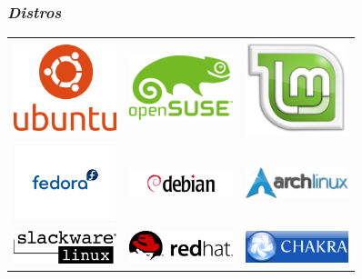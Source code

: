 \documentclass{beamer}
\begin{document}
\begin{frame}
   \frametitle{\emph{Distros}}
   \begin{center}
     \renewcommand\arraystretch{2}
     \begin{tabular}{c c c}
       \includegraphics[width=3cm]{ubuntu.png} & \includegraphics[width=3cm]{opensuse.png} & \includegraphics[width=3cm]{mint.jpg}\\
       \includegraphics[width=3cm,trim=10mm 60mm 10mm 60mm,clip]{fedora.jpg} & \includegraphics[width=3cm]{debian.png} & \includegraphics[width=3cm]{arch.png}\\
       \includegraphics[width=3cm]{slack.png} & \includegraphics[width=3cm]{redhat.jpg} & \includegraphics[width=3cm]{chakra.png}
     \end{tabular}
   \end{center}
\end{frame}
\end{document}
